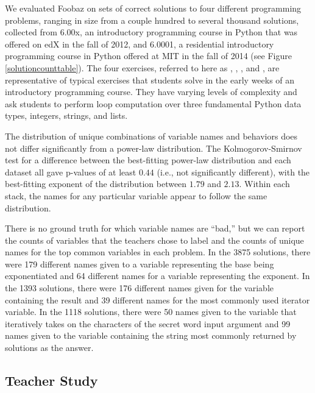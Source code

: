 We evaluated Foobaz on sets of correct solutions to four different programming problems, ranging in size from a couple hundred to several thousand solutions, collected from 6.00x, an introductory programming course in Python that was offered on edX in the fall of 2012, and 6.0001, a residential introductory programming course in Python offered at MIT in the fall of 2014 (see Figure \ref{solutioncounttable}). The four exercises, referred to here as , , , and , are representative of typical exercises that students solve in the early weeks of an introductory programming course. They have varying levels of complexity and ask students to perform loop computation over three fundamental Python data types, integers, strings, and lists.


The distribution of unique combinations of variable names and behaviors does not differ significantly from a power-law distribution. The Kolmogorov-Smirnov test for a difference between the best-fitting power-law distribution and each dataset all gave p-values of at least $0.44$ (i.e., not significantly different), with the best-fitting exponent of the distribution between $1.79$ and $2.13$. Within each stack, the names for any particular variable appear to follow the same distribution.

There is no ground truth for which variable names are ``bad,'' but we can report the counts of variables that the teachers chose to label and the counts of unique names for the top common variables in each problem. In the 3875  solutions, there were 179 different names given to a variable representing the base being exponentiated and 64 different names for a variable representing the exponent. In the 1393  solutions, there were 176 different names given for the variable containing the result and 39 different names for the most commonly used iterator variable. In the 1118  solutions, there were 50 names given to the variable that iteratively takes on the characters of the secret word input argument and 99 names given to the variable containing the string most commonly returned by solutions as the answer.

\subsection{Teacher Study}

